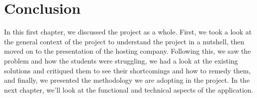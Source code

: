 \section*{Conclusion}
In this first chapter, we discussed the project as a whole. First, we took a look at the general context of the project to understand the project in a nutshell, then moved on to the presentation of the hosting company. Following this, we saw the problem and how the students were struggling, we had a look at the existing solutions and critiqued them to see their shortcomings and how to remedy them, and finally, we presented the methodology we are adopting in the project. In the next chapter, we'll look at the functional and technical aspects of the application.

 
  